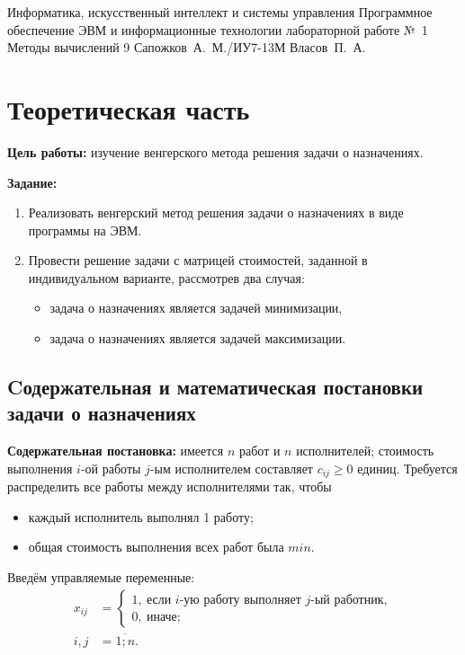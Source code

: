 \documentclass{bmstu}
\begin{document}
	
	\makereporttitle
	{Информатика, искусственный интеллект и системы управления}
	{Программное обеспечение ЭВМ и информационные технологии}
	{лабораторной работе №~1}
	{Методы вычислений}
	{}
	{9}
	{Сапожков~А.~М./ИУ7-13М}
	{Власов~П.~А.}
	
\chapter{Теоретическая часть}

\textbf{Цель работы:} изучение венгерского метода решения задачи о назначениях.

\textbf{Задание:}
\begin{enumerate}
	\item Реализовать венгерский метод решения задачи о назначениях в виде программы на ЭВМ.
	\item Провести решение задачи с матрицей стоимостей, заданной в индивидуальном варианте, рассмотрев два случая:
	\begin{itemize}
		\item задача о назначениях является задачей минимизации,
		\item задача о назначениях является задачей максимизации.
	\end{itemize}
\end{enumerate}

\section{Cодержательная и математическая постановки задачи о назначениях}

\textbf{Содержательная постановка:} имеется $n$ работ и $n$ исполнителей; стоимость выполнения $i$-ой работы $j$-ым исполнителем составляет $c_{ij} \geqslant 0$ единиц. Требуется распределить все работы между исполнителями так, чтобы
\begin{itemize}
	\item каждый исполнитель выполнял 1 работу;
	\item общая стоимость выполнения всех работ была $min$.
\end{itemize}

Введём управляемые переменные:
\begin{align}
	x_{ij} & =
	\begin{cases}
		1, \: \text{если $i$-ую работу выполняет $j$-ый работник}, \\
		0, \: \text{иначе};
	\end{cases} \nonumber \\
	i, j & = \overline{1; n}. 
\end{align}
\end{document}
